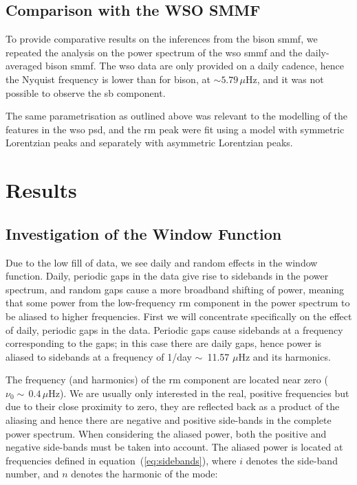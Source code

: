 \subsection{Comparison with the WSO SMMF}

To provide comparative results on the inferences from the \gls{bison} \gls{smmf}, we repeated the analysis on the power spectrum of the \gls{wso} \gls{smmf} and the daily-averaged \gls{bison} \gls{smmf}. The \gls{wso} data are only provided on a daily cadence, hence the Nyquist frequency is lower than for \gls{bison}, at $\sim 5.79 \, \mu\mathrm{Hz}$, and it was not possible to observe the \gls{sb} component.

The same parametrisation as outlined above was relevant to the modelling of the features in the \gls{wso} \gls{psd}, and the \gls{rm} peak were fit using a model with symmetric Lorentzian peaks and separately with asymmetric Lorentzian peaks.


\section{Results}\label{sec:SMMF_reults}

\subsection{Investigation of the Window Function}\label{sec:window_fn}


Due to the low fill of data, we see daily and random effects in the window function. Daily, periodic gaps in the data give rise to sidebands in the power spectrum, and random gaps cause a more broadband shifting of power, meaning that some power from the low-frequency \gls{rm} component in the power spectrum to be aliased to higher frequencies. First we will concentrate specifically on the effect of daily, periodic gaps in the data. Periodic gaps cause sidebands at a frequency corresponding to the gaps; in this case there are daily gaps, hence power is aliased to sidebands at a frequency of 1/day $\sim$~11.57 $\mu$Hz and its harmonics.

The frequency (and harmonics) of the \gls{rm} component are located near zero ($\nu_0 \sim \,0.4 \, \mu\mathrm{Hz}$). We are usually only interested in the real, positive frequencies but due to their close proximity to zero, they are reflected back as a product of the aliasing and hence there are negative and positive side-bands in the complete power spectrum. When considering the aliased power, both the positive and negative side-bands must be taken into account. The aliased power is located at frequencies defined in equation~(\ref{eq:sidebands}), where $i$ denotes the side-band number, and $n$ denotes the harmonic of the mode:


